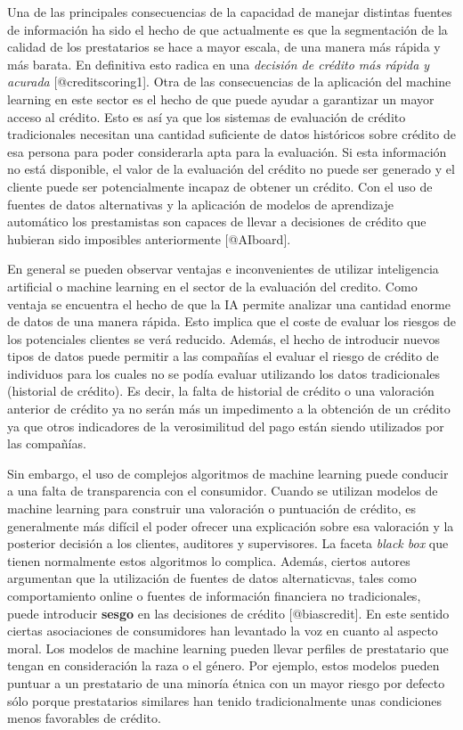 \documentclass[]{article}
\begin{document}
Una de las principales consecuencias de la capacidad de manejar
distintas fuentes de información ha sido el hecho de que actualmente es
que la segmentación de la calidad de los prestatarios se hace a mayor
escala, de una manera más rápida y más barata. En definitiva esto radica
en una \emph{decisión de crédito más rápida y acurada}
{[}@creditscoring1{]}. Otra de las consecuencias de la aplicación del
machine learning en este sector es el hecho de que puede ayudar a
garantizar un mayor acceso al crédito. Esto es así ya que los sistemas
de evaluación de crédito tradicionales necesitan una cantidad suficiente
de datos históricos sobre crédito de esa persona para poder considerarla
apta para la evaluación. Si esta información no está disponible, el
valor de la evaluación del crédito no puede ser generado y el cliente
puede ser potencialmente incapaz de obtener un crédito. Con el uso de
fuentes de datos alternativas y la aplicación de modelos de aprendizaje
automático los prestamistas son capaces de llevar a decisiones de
crédito que hubieran sido imposibles anteriormente {[}@AIboard{]}.

\setlength\parskip{5ex}

En general se pueden observar ventajas e inconvenientes de utilizar
inteligencia artificial o machine learning en el sector de la evaluación
del credito. Como ventaja se encuentra el hecho de que la IA permite
analizar una cantidad enorme de datos de una manera rápida. Esto implica
que el coste de evaluar los riesgos de los potenciales clientes se verá
reducido. Además, el hecho de introducir nuevos tipos de datos puede
permitir a las compañías el evaluar el riesgo de crédito de individuos
para los cuales no se podía evaluar utilizando los datos tradicionales
(historial de crédito). Es decir, la falta de historial de crédito o una
valoración anterior de crédito ya no serán más un impedimento a la
obtención de un crédito ya que otros indicadores de la verosimilitud del
pago están siendo utilizados por las compañías.

\setlength\parskip{5ex}

Sin embargo, el uso de complejos algoritmos de machine learning puede
conducir a una falta de transparencia con el consumidor. Cuando se
utilizan modelos de machine learning para construir una valoración o
puntuación de crédito, es generalmente más difícil el poder ofrecer una
explicación sobre esa valoración y la posterior decisión a los clientes,
auditores y supervisores. La faceta \emph{black box} que tienen
normalmente estos algoritmos lo complica. Además, ciertos autores
argumentan que la utilización de fuentes de datos alternaticvas, tales
como comportamiento online o fuentes de información financiera no
tradicionales, puede introducir \textbf{sesgo} en las decisiones de
crédito {[}@biascredit{]}. En este sentido ciertas asociaciones de
consumidores han levantado la voz en cuanto al aspecto moral. Los
modelos de machine learning pueden llevar perfiles de prestatario que
tengan en consideración la raza o el género. Por ejemplo, estos modelos
pueden puntuar a un prestatario de una minoría étnica con un mayor
riesgo por defecto sólo porque prestatarios similares han tenido
tradicionalmente unas condiciones menos favorables de crédito.
\end{document}
